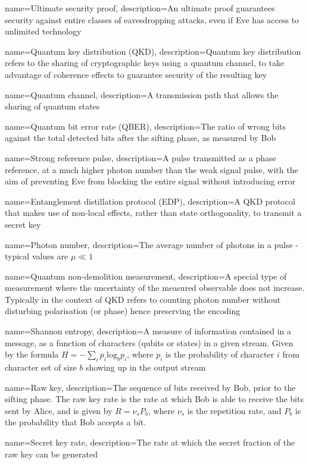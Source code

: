  {
name={Ultimate security proof},
description={An ultimate proof guarantees security against entire classes of eavesdropping attacks, even if Eve has access to unlimited technology}
}

 {name={Quantum key distribution (QKD)},
description={Quantum key distribution refers to the sharing of cryptographic keys using a quantum channel, to take advantage of coherence effects to guarantee security of the resulting key}
}

 {
name={Quantum channel},
description={A transmission path that allows the sharing of quantum states}
}

 {
name={Quantum bit error rate (QBER)},
description={The ratio of wrong bits against the total detected bits after the sifting phase, as measured by Bob}
}

 {
name={Strong reference pulse},
description={A pulse transmitted as a phase reference, at a much higher photon number than the weak signal pulse, with the aim of preventing Eve from blocking the entire signal without introducing error}
}

 {
name={Entanglement distillation protocol (EDP)},
description={A QKD protocol that makes use of non-local effects, rather than state orthogonality, to transmit a secret key}
}

 {
name={Photon number},
description={The average number of photons in a pulse - typical values are $\mu \ll 1$}
}

 {
name={Quantum non-demolition measurement},
description={A special type of measurement where the uncertainty of the measured observable does not increase. Typically in the context of QKD refers to counting photon number without disturbing polarisation (or phase) hence preserving the encoding}
}

 {
name={Shannon entropy},
description={A measure of information contained in a message, as a function of characters (qubits or states) in a given stream. Given by the formula $H = -\sum_i p_i \mathrm{log}_b p_i$, where $p_i$ is the probability of character $i$ from character set of size $b$ showing up in the output stream}
}

 {
name={Raw key},
description={The sequence of bits received by Bob, prior to the sifting phase. The raw key rate is the rate at which Bob is able to receive the bits sent by Alice, and is given by $R = \nu_s P_b$, where $\nu_s$ is the repetition rate, and $P_b$ is the probability that Bob accepts a bit.}
}

 {
name={Secret key rate},
description={The rate at which the secret fraction of the raw key can be generated}
}
